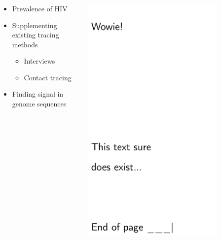 \documentclass[aspectratio=169]{beamer}
\begin{document}
\begin{frame} \frametitle{\insertsection}

    \begin{columns}

        \begin{column}{0.5\textwidth}
            \begin{itemize}
                \item Prevalence of HIV
                \item Supplementing existing tracing methods
                \begin{itemize}
                    \item Interviews
                    \item Contact tracing
                \end{itemize}
                \item Finding signal in genome sequences 
            \end{itemize}
        \end{column}
        
        \begin{column}{0.5\textwidth}
            \begin{center}
                \centering\includegraphics[width=0.8\textwidth]{images/hiv-figure}
            \end{center}
        \end{column}


\end{columns}
\end{frame}
\end{document}
